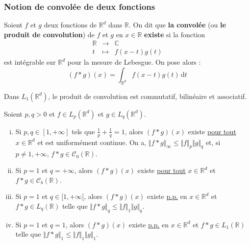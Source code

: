 	\subsubsection{Notion de convolée de deux fonctions}


	\begin{definition}
		Soient $f$ et $g$ deux fonctions de $\mathbb{R}^d$ dans $\mathbb{R}$. On dit que \textbf{la convolée} (ou \textbf{le produit de convolution}) de $f$ et $g$ en $x \in \mathbb{R}$ \textbf{existe} si la fonction
		\[
		\begin{array}{ccc}
			\mathbb{R} &\rightarrow& \mathbb{C} \\
			t &\mapsto& f(x-t)g(t)
		\end{array}
		\]
		est intégrable sur $\mathbb{R}^d$ pour la mesure de Lebesgue. On pose alors :
		\[ (f * g)(x) = \int_{\mathbb{R}^d} f(x-t)g(t) \, \mathrm{d}t \]
	\end{definition}

	\begin{proposition}
		Dans $L_1(\mathbb{R}^d)$, le produit de convolution est commutatif, bilinéaire et associatif.
	\end{proposition}

	\begin{theorem}
		Soient $p, q > 0$ et $f \in L_p(\mathbb{R}^d)$ et $g \in L_q(\mathbb{R}^d)$.
		\begin{enumerate}[(i)]
			\item Si $p, q \in [1, +\infty]$ tels que $\frac{1}{p} + \frac{1}{q} = 1$, alors $(f * g)(x)$ existe \underline{pour tout} $x \in \mathbb{R}^d$ et est uniformément continue. On a, $\Vert f * g \Vert_\infty \leq \Vert f \Vert_p \Vert g \Vert_q$ et, si $p \neq 1, +\infty$, $f * g \in \mathcal{C}_0(\mathbb{R})$.
			\item Si $p = 1$ et $q = +\infty$, alors $(f * g)(x)$ existe \underline{pour tout} $x \in \mathbb{R}^d$ et $f * g \in \mathcal{C}_b(\mathbb{R})$.
			\item Si $p = 1$ et $q \in [1, +\infty[$, alors $(f * g)(x)$ existe \underline{p.p.} en $x \in \mathbb{R}^d$ et $f * g \in L_q(\mathbb{R})$ telle que $\Vert f * g \Vert_q \leq \Vert f \Vert_1 \Vert g \Vert_q$.
			\item Si $p = 1$ et $q = 1$, alors $(f * g)(x)$ existe \underline{p.p.} en $x \in \mathbb{R}^d$ et $f * g \in L_1(\mathbb{R})$ telle que $\Vert f * g \Vert_1 \leq \Vert f \Vert_1 \Vert g \Vert_1$.
		\end{enumerate}
	\end{theorem}

